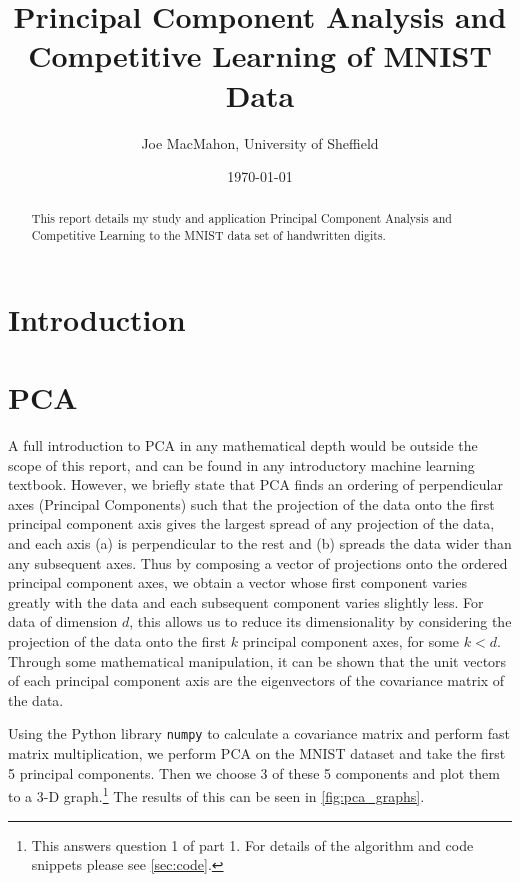 \documentclass[a4paper, 11pt, twocolumn, draft]{article} %
\title{Principal Component Analysis and Competitive Learning of MNIST Data}
\author{Joe MacMahon, University of Sheffield}
\date{\today}
\begin{document}
\maketitle

\begin{abstract}

This report details my study and application Principal Component Analysis and
Competitive Learning to the MNIST data set of handwritten digits.

\end{abstract}

\tableofcontents

\section{Introduction}

\section{PCA} A full introduction to PCA in any mathematical depth would be
outside the scope of this report, and can be found in any introductory machine
learning textbook.  However, we briefly state that PCA finds an ordering of
perpendicular axes (Principal Components) such that the projection of the data
onto the first principal component axis gives the largest spread of any
projection of the data, and each axis (a) is perpendicular to the rest and (b)
spreads the data wider than any subsequent axes.  Thus by composing a vector of
projections onto the ordered principal component axes, we obtain a vector whose
first component varies greatly with the data and each subsequent component
varies slightly less. For data of dimension $d$, this allows us to reduce its
dimensionality by considering the projection of the data onto the first $k$
principal component axes, for some $k < d$.  Through some mathematical
manipulation, it can be shown that the unit vectors of each principal component
axis are the eigenvectors of the covariance matrix of the data.

Using the Python library \texttt{numpy} to calculate a covariance matrix and
perform fast matrix multiplication, we perform PCA on the MNIST dataset and take
the first 5 principal components. Then we choose 3 of these 5 components and
plot them to a 3-D graph.\footnote{This answers question 1 of part 1.  For
details of the algorithm and code snippets please see \autoref{sec:code}.}
The results of this can be seen in \autoref{fig:pca_graphs}.
\end{document}

